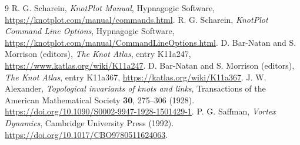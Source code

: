 \begin{thebibliography}{9}
R. G. Scharein, \emph{KnotPlot Manual}, Hypnagogic Software,
\url{https://knotplot.com/manual/commands.html}.
R. G. Scharein, \emph{KnotPlot Command Line Options}, Hypnagogic Software,
\url{https://knotplot.com/manual/CommandLineOptions.html}.
D. Bar-Natan and S. Morrison (editors), \emph{The Knot Atlas}, entry K11a247,
\url{https://www.katlas.org/wiki/K11a247}.
D. Bar-Natan and S. Morrison (editors), \emph{The Knot Atlas}, entry K11a367,
\url{https://katlas.org/wiki/K11a367}.
J. W. Alexander, \emph{Topological invariants of knots and links},
Transactions of the American Mathematical Society \textbf{30}, 275--306 (1928).
\url{https://doi.org/10.1090/S0002-9947-1928-1501429-1}.
P. G. Saffman, \emph{Vortex Dynamics}, Cambridge University Press (1992).
\url{https://doi.org/10.1017/CBO9780511624063}.
\end{thebibliography}
